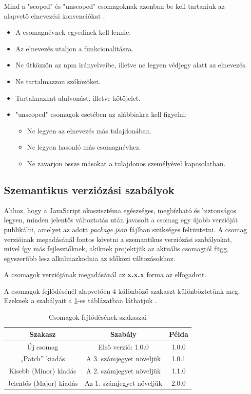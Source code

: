 	Mind a "scoped" és "unscoped" csomagoknak azonban be kell tartaniuk az alapvető elnevezési konvenciókat \cite{npm-naming}.
	
	\begin{itemize}
		\item A csomagnévnek egyedinek kell lennie.
		\item Az elnevezés utaljon a funkcionalitásra.
		\item Ne ütközzön az npm irányelveibe, illetve ne legyen védjegy alatt az elnevezés.
		\item Ne tartalmazzon szóközöket.
		\item Tartalmazhat alulvonást, illetve kötőjelet.
		\item "unscoped" csomagok esetében az alábbiakra kell figyelni:
		\begin{itemize}
			\item Ne legyen az elnevezés más tulajdonában.
			\item Ne legyen hasonló más csomagnévhez.
			\item Ne zavarjon össze másokat a tulajdonos személyével kapcsolatban.
		\end{itemize}
	\end{itemize}

	\subsection{Szemantikus verziózási szabályok}
	
	Ahhoz, hogy a JavaScript ökoszisztéma egészséges, megbízható és biztonságos legyen, minden jelentős változtatás után javasolt a csomag egy újabb verzióját publikálni, amelyet az adott \emph{package.json} fájlban szükséges feltüntetni. A csomag verzióinak megadásánál fontos követni a szemantikus verziózási szabályokat, mivel így más fejlesztőknek, akiknek projektjük az aktuális csomagtól függ, egyszerűbb lesz alkalmazkodnia az időközi változásokhoz.
	
	A csomagok verziójának megadásánál az \textbf{x.x.x} forma az elfogadott.
	
	A csomagok fejlődésénél alapvetően 4 különböző szakaszt különböztetünk meg. Ezeknek a szabályait a \ref{tab:package-lifecycle}-es táblázatban láthatjuk \cite{npm-versioning}.
	
	\begin{table}[h]
		\centering
		\caption{Csomagok fejlődésének szakaszai}
		\label{tab:package-lifecycle}
		\begin{tabular}{|c|c|c|}
			\hline
			\textbf{Szakasz} & \textbf{Szabály} & \textbf{Példa} \\
			\hline
			Új csomag & Első verzió: 1.0.0 & 1.0.0 \\
			\hline
			„Patch” kiadás & A 3. számjegyet növeljük & 1.0.1 \\
			\hline
			Kisebb (Minor) kiadás & A 2. számjegyet növeljük & 1.1.0 \\
			\hline
			Jelentős (Major) kiadás & Az 1. számjegyet növeljük & 2.0.0 \\
			\hline
		\end{tabular}
	\end{table}

